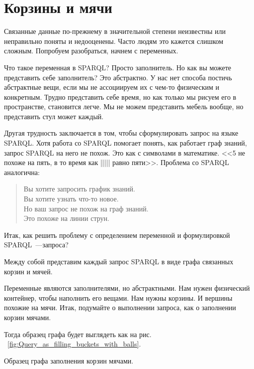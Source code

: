 \chapter{Корзины и мячи}
\label{ch:BucketsAndBalls}

Связанные данные по-прежнему в значительной степени неизвестны или неправильно поняты и недооценены. Часто людям это кажется слишком сложным. 
Попробуем разобраться, начнем с переменных.

Что такое переменная в SPARQL? Просто заполнитель. Но как вы можете представить себе заполнитель? Это абстрактно. У нас нет способа постичь абстрактные вещи, если мы не ассоциируем их с чем-то физическим и конкретным. Трудно представить себе время, но как только мы рисуем его в пространстве, становится легче. Мы не можем представить мебель вообще, но представить стул может каждый.

Другая трудность заключается в том, чтобы сформулировать запрос на языке SPARQL. Хотя работа со SPARQL помогает понять, как работает граф знаний, запрос SPARQL на него не похож. Это как с символами в математике. <<5 не похоже на пять, в то время как ||||| равно пяти>>. Проблема со SPARQL аналогична:

\begin{quote}
Вы хотите запросить график знаний.\\
Вы хотите узнать что-то новое.\\
Но ваш запрос не похож на граф знаний.\\
Это похоже на линии струн.\\
\end{quote}

Итак, как решить проблему с определением переменной и формулировкой SPARQL~---запроса?

Между собой представим каждый запрос SPARQL в виде графа связанных корзин и мячей.

Переменные являются заполнителями, но абстрактными. Нам нужен физический контейнер, чтобы наполнить его вещами. Нам нужны корзины. И вершины похожие на мячи. Итак, подумайте о выполнении запроса, как о заполнении корзин мячами.

Тогда образец графа будет выглядеть как на рис. ~\ref{fig:Query_as_filling_buckets_with_balls}.

\begin{marginfigure}[-1.5cm]
	{
		\setlength{\fboxsep}{0pt}%
		\setlength{\fboxrule}{1pt}%
	}
    \caption{Образец графа заполнения корзин мячами.}
	\label{fig:Query_as_filling_buckets_with_balls}
\end{marginfigure}

